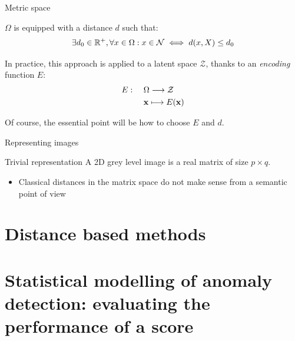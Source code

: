 \documentclass[xcolor=pdftex,dvipsnames,table,mathserif]{beamer}
\begin{document}
\begin{frame}{Metric space}

  $\Omega$ is equipped with a distance $d$ such that:
  \[
  \exists d_0 \in \mathbb{R}^+,  \forall x \in \Omega: x \in \mathcal{N} \iff d(x, X) \leq d_0
  \]

In practice, this approach is applied to a latent space $\mathcal{Z}$, thanks to an  \emph{encoding} function $E$:
    \[
    \begin{split}
    E: & ~~~~\Omega \longrightarrow \mathcal{Z} \\
    & ~~~~ \mathbf{x} \longmapsto E(\mathbf{x})
    \end{split}
    \]


  Of course, the essential point will be how to choose $E$ and $d$.

\end{frame}






\begin{frame}{Representing images}

  \begin{block}{Trivial representation}
    A 2D grey level image is a real matrix of size $p \times q$.
  \end{block}

  \begin{itemize}
  \item Classical distances in the matrix space do not make sense from a semantic point of view
  \end{itemize}

\end{frame}



\section{Distance based methods}
\section{Statistical modelling of anomaly detection: evaluating the performance of a score}
\end{document}
